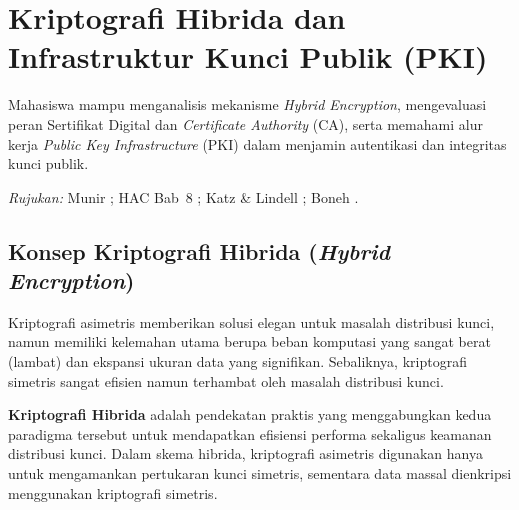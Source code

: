 \section{Kriptografi Hibrida dan Infrastruktur Kunci Publik (PKI)}

\begin{subcpmk}
  \item Mahasiswa mampu menganalisis mekanisme \textit{Hybrid Encryption}, mengevaluasi peran Sertifikat Digital dan \textit{Certificate Authority} (CA), serta memahami alur kerja \textit{Public Key Infrastructure} (PKI) dalam menjamin autentikasi dan integritas kunci publik.
\end{subcpmk}

\noindent\textit{Rujukan:} Munir \cite{munir2019,munir_slides_itb}; HAC Bab~8 \cite{hac_online}; Katz \& Lindell \cite{katz2020}; Boneh \cite{boneh_cs255}.

\subsection{Konsep Kriptografi Hibrida (\textit{Hybrid Encryption})}

Kriptografi asimetris memberikan solusi elegan untuk masalah distribusi kunci, namun memiliki kelemahan utama berupa beban komputasi yang sangat berat (lambat) dan ekspansi ukuran data yang signifikan. Sebaliknya, kriptografi simetris sangat efisien namun terhambat oleh masalah distribusi kunci.

\textbf{Kriptografi Hibrida} adalah pendekatan praktis yang menggabungkan kedua paradigma tersebut untuk mendapatkan efisiensi performa sekaligus keamanan distribusi kunci. Dalam skema hibrida, kriptografi asimetris digunakan hanya untuk mengamankan pertukaran kunci simetris, sementara data massal dienkripsi menggunakan kriptografi simetris.

